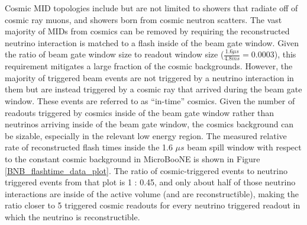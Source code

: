 Cosmic MID topologies include but are not limited to showers that radiate off of cosmic ray muons, and showers born from cosmic neutron scatters. The vast majority of MIDs from cosmics can be removed by requiring the reconstructed neutrino interaction is matched to a flash inside of the beam gate window. Given the ratio of beam gate window size to readout window size ($\frac{1.6\mu s}{4.8ms}=0.0003$), this requirement mitigates a large fraction of the cosmic backgrounds. However, the majority of triggered beam events are not triggered by a neutrino interaction in them but are instead triggered by a cosmic ray that arrived during the beam gate window. These events are referred to as ``in-time'' cosmics. Given the number of readouts triggered by cosmics inside of the beam gate window rather than neutrinos arriving inside of the beam gate window, the cosmics background can be sizable, especially in the relevant low energy region. The measured relative rate of reconstructed flash times inside the 1.6 $\mu s$ beam spill window with respect to the constant cosmic background in MicroBooNE is shown in Figure \ref{BNB_flashtime_data_plot}. The ratio of cosmic-triggered events to neutrino triggered events from that plot is 1 : 0.45, and only about half of those neutrino interactions are inside of the active volume (and are reconstructible), making the ratio closer to 5 triggered cosmic readouts for every neutrino triggered readout in which the neutrino is reconstructible.\\%


